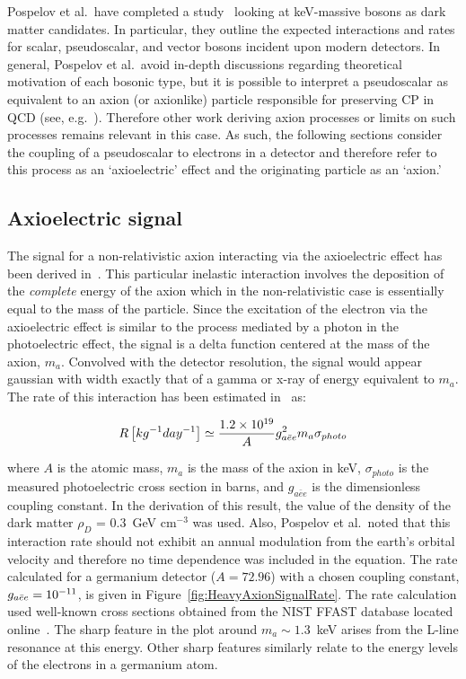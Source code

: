 	Pospelov et al.~have completed a study~\cite{Pospelov:2008jk} looking at keV-massive bosons as dark matter candidates.  In particular, they outline the expected interactions and rates for scalar, pseudoscalar, and vector bosons incident upon modern detectors.  In general, Pospelov et al.~avoid in-depth discussions regarding theoretical motivation of each bosonic type, but it is possible to interpret a pseudoscalar as equivalent to an axion (or axionlike) particle responsible for preserving CP in QCD (see, e.g.~\cite{Amsler20081}).  Therefore other work deriving axion processes or limits on such processes remains relevant in this case.  As such, the following sections consider the coupling of a pseudoscalar to electrons in a detector and therefore refer to this process as an `axioelectric' effect and the originating particle as an `axion.'  

	\subsection{Axioelectric signal}
	\label{sec:CalcLimitsOnHeavyAxionSignal}		

	The signal for a non-relativistic axion interacting via the axioelectric effect has been derived in~\cite{Pospelov:2008jk}.  This particular inelastic interaction involves the deposition of the \emph{complete} energy of the axion which in the non-relativistic case is essentially equal to the mass of the particle.  Since the excitation of the electron via the axioelectric effect is similar to the process mediated by a photon in the photoelectric effect, the signal is a delta function centered at the mass of the axion, $m_{a}$.  Convolved with the detector resolution, the signal would appear gaussian with width exactly that of a gamma or x-ray of energy equivalent to $m_{a}$.  The rate of this interaction has been estimated in~\cite{Pospelov:2008jk} as:
	
		\begin{equation}
			R \left[ kg^{-1} day^{-1} \right]\simeq \frac{1.2\times 10^{19}}{A} g_{a\bar{e}e}^{2} m_a \sigma_{photo}
			\label{eqn:AxioelectricRate}
		\end{equation}

where $A$ is the atomic mass, $m_{a}$ is the mass of the axion in keV, $\sigma_{photo}$ is the measured photoelectric cross section in barns, and $g_{a\bar{e}e}$ is the dimensionless coupling constant.  In the derivation of this result, the value of the density of the dark matter $\rho_{D}$ = 0.3~GeV cm$^{-3}$ was used.  Also, Pospelov et al.~noted that this interaction rate should not exhibit an annual modulation from the earth's orbital velocity and therefore no time dependence was included in the equation.  The rate calculated for a germanium detector ($A=72.96$) with a chosen coupling constant, $g_{a\bar{e}e} = 10^{-11}$, is given in Figure~\ref{fig:HeavyAxionSignalRate}.  The rate calculation used well-known cross sections obtained from the NIST FFAST database located online~\cite{chantler:597}.  The sharp feature in the plot around $m_{a}\sim1.3$~keV arises from the L-line resonance at this energy.  Other sharp features similarly relate to the energy levels of the electrons in a germanium atom.  


